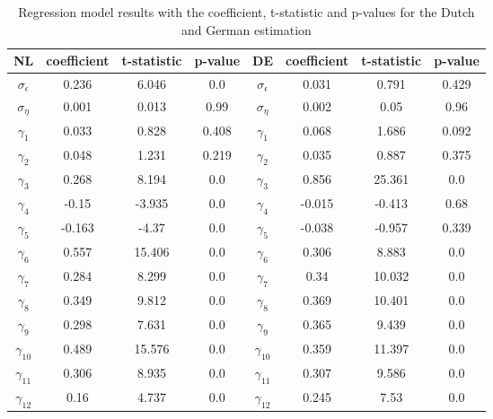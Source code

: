 \begin{table}[]
    \centering
    \begin{tabular}{|c|c c c||c|c c c|}\hline
        NL & coefficient & t-statistic & p-value & DE & coefficient & t-statistic & p-value\\\hline     
        $\sigma_{\epsilon}$ & 0.236 & 6.046 & 0.0 &  $\sigma_{\epsilon}$ & 0.031 & 0.791 & 0.429\\
        $\sigma_{\eta}$ & 0.001 & 0.013 & 0.99 & $\sigma_{\eta}$ & 0.002 & 0.05 & 0.96\\
        $\gamma_{1}$ & 0.033 & 0.828 & 0.408 & $\gamma_{1}$ & 0.068 & 1.686 & 0.092\\
        $\gamma_{2}$ & 0.048 & 1.231 & 0.219 & $\gamma_{2}$ & 0.035 & 0.887 & 0.375\\
        $\gamma_{3}$ & 0.268 & 8.194 & 0.0 & $\gamma_{3}$ & 0.856 & 25.361 & 0.0\\
        $\gamma_{4}$ & -0.15 & -3.935 & 0.0 & $\gamma_{4}$ & -0.015 & -0.413 & 0.68\\
        $\gamma_{5}$ & -0.163 & -4.37 & 0.0 & $\gamma_{5}$ & -0.038 & -0.957 & 0.339\\
        $\gamma_{6}$ & 0.557 & 15.406 & 0.0 & $\gamma_{6}$ & 0.306 & 8.883 & 0.0\\
        $\gamma_{7}$ & 0.284 & 8.299 & 0.0 & $\gamma_{7}$ & 0.34 & 10.032 & 0.0\\
        $\gamma_{8}$ & 0.349 & 9.812 & 0.0 & $\gamma_{8}$ & 0.369 & 10.401 & 0.0\\
        $\gamma_{9}$ & 0.298 & 7.631 & 0.0 & $\gamma_{9}$ & 0.365 & 9.439 & 0.0\\
        $\gamma_{10}$ & 0.489 & 15.576 & 0.0 & $\gamma_{10}$ & 0.359 & 11.397 & 0.0\\
        $\gamma_{11}$ & 0.306 & 8.935 & 0.0 & $\gamma_{11}$ & 0.307 & 9.586 & 0.0\\
        $\gamma_{12}$ & 0.16 & 4.737 & 0.0 & $\gamma_{12}$ & 0.245 & 7.53 & 0.0\\\hline
    \end{tabular}
    \caption{Regression model results with the coefficient, t-statistic and p-values for the Dutch and German estimation}
    \label{tab:regression_model_results}
\end{table}

